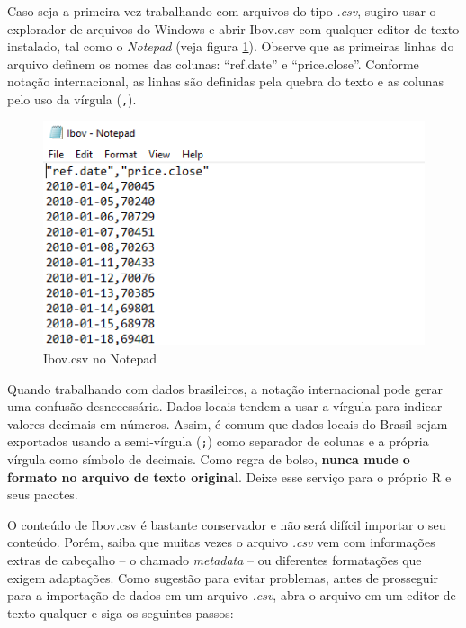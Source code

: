 \documentclass[
  11pt,
]{book}
\newenvironment{rmdcaution}
{\begin{cautionblock}

} {\end{cautionblock}}
\begin{document}
Caso seja a primeira vez trabalhando com arquivos do tipo \emph{.csv}, sugiro usar o explorador de arquivos do Windows e abrir Ibov.csv com qualquer editor de texto instalado, tal como o \emph{Notepad} (veja figura \ref{fig:notepad}). Observe que as primeiras linhas do arquivo definem os nomes das colunas: ``ref.date'' e ``price.close''. Conforme notação internacional, as linhas são definidas pela quebra do texto e as colunas pelo uso da vírgula (\texttt{,}).

\begin{figure}[!htbp]

{\centering \includegraphics[width=1\linewidth]{00-text-resources/figs/example_csv_notepad} 

}

\caption{Ibov.csv no Notepad}\label{fig:notepad}
\end{figure}

\begin{rmdcaution}
Quando trabalhando com dados brasileiros, a notação internacional pode
gerar uma confusão desnecessária. Dados locais tendem a usar a vírgula
para indicar valores decimais em números. Assim, é comum que dados
locais do Brasil sejam exportados usando a semi-vírgula (\texttt{;})
como separador de colunas e a própria vírgula como símbolo de decimais.
Como regra de bolso, \textbf{nunca mude o formato no arquivo de texto
original}. Deixe esse serviço para o próprio R e seus pacotes.
\end{rmdcaution}

O conteúdo de Ibov.csv é bastante conservador e não será difícil importar o seu conteúdo. Porém, saiba que muitas vezes o arquivo \emph{.csv} vem com informações extras de cabeçalho -- o chamado \emph{metadata} -- ou diferentes formatações que exigem adaptações. Como sugestão para evitar problemas, antes de prosseguir para a importação de dados em um arquivo \emph{.csv}, abra o arquivo em um editor de texto qualquer e siga os seguintes passos:
\end{document}
